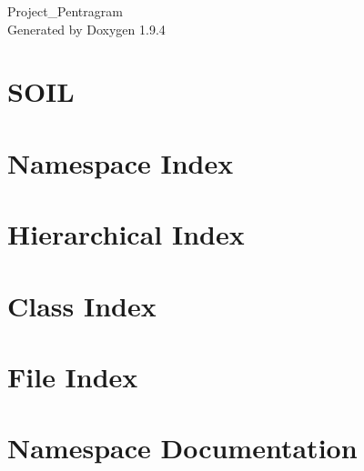 \documentclass[twoside]{book}
\newcommand{\+}{\discretionary{\mbox{\scriptsize$\hookleftarrow$}}{}{}}
\newcommand{\clearemptydoublepage}{%
    \newpage{\pagestyle{empty}\cleardoublepage}%
  }
\begin{document}
  \raggedbottom
    \hypersetup{pageanchor=false,
                bookmarksnumbered=true,
                pdfencoding=unicode
               }
  \begin{titlepage}
  \vspace*{7cm}
  \begin{center}%
  {\Large Project\+\_\+\+Pentragram}\\
  \vspace*{1cm}
  {\large Generated by Doxygen 1.9.4}\\
  \end{center}
  \end{titlepage}
  \clearemptydoublepage
  \tableofcontents
  \clearemptydoublepage
  \hypersetup{pageanchor=true}
\chapter{SOIL}
\label{index}\hypertarget{index}{}
\chapter{Namespace Index}

\chapter{Hierarchical Index}

\chapter{Class Index}

\chapter{File Index}

\chapter{Namespace Documentation}



\end{document}
